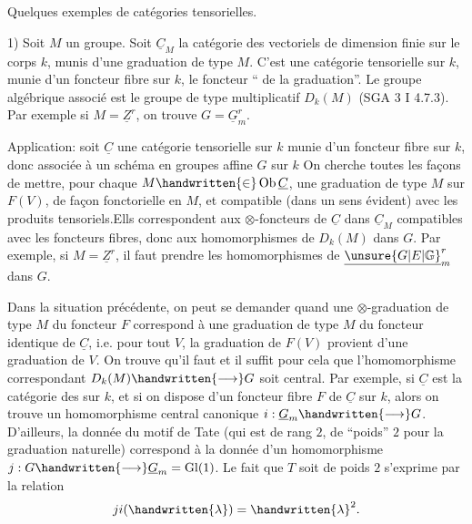 
Quelques exemples de catégories tensorielles.

1) Soit $M$ un groupe. Soit $\underline{C}_M$ la catégorie des vectoriels de dimension finie sur le corps $k$, munis d'une graduation de type $M$. C'est une catégorie tensorielle sur $k$, munie d'un foncteur fibre sur $k$, le foncteur `` de la graduation''. Le groupe algébrique associé est le groupe de type multiplicatif $D_k(M)$ (SGA 3 I 4.7.3). Par exemple si $M=\underline{Z}^r$, on trouve $G=\underline{G}_m^r$.

Application: soit $\underline{C}$ une catégorie tensorielle sur $k$ munie d'un foncteur fibre  sur $k$, donc associée à un schéma en groupes affine $G$ sur $k$ On cherche toutes les façons de mettre, pour chaque $M\handwritten{\in}\operatorname{Ob}\underline{C}$, une graduation de type $M$ sur $F(V)$, de façon fonctorielle en $M$, et compatible (dans un sens évident) avec les produits tensoriels.Ells correspondent aux $\otimes$-foncteurs de $\underline{C}$ dans $\underline{C}_M$ compatibles avec les foncteurs fibres, donc aux homomorphismes de $D_k(M)$ dans $G$. Par exemple, si $M=\underline{Z}^r$, il faut prendre les homomorphismes de $\underline{\unsure{G|E|\mathbb{G}}}_m^r$ dans $G$.

Dans la situation précédente, on peut se demander quand une $\otimes$-graduation de type $M$ du foncteur $F$ correspond à une graduation de type $M$ du foncteur identique de $\underline{C}$, i.e. pour tout $V$, la graduation de $F(V)$ provient d'une graduation de $V$. On trouve qu'il faut et il suffit pour cela que l'homomorphisme correspondant $D_k(M)\handwritten{\longrightarrow}G$ soit central. Par exemple, si $\underline{C}$ est la catégorie des  sur $k$, et si on dispose d'un foncteur fibre $F$ de $\underline{C}$ sur $k$, alors on trouve un homomorphisme central canonique $i:\underline{G}_m\handwritten{\longrightarrow}G$. D'ailleurs, la donnée du motif de Tate (qui est de rang $2$,  de ``poids'' $2$ pour la graduation naturelle) correspond à  la donnée d'un homomorphisme $j:G\handwritten{\longrightarrow}\underline{G}_m=\operatorname{Gl}(1)$. Le fait que $T$ soit de poids $2$ s'exprime par la relation
\[
ji(\handwritten{\lambda})=\handwritten{\lambda}^{2}.
\]

